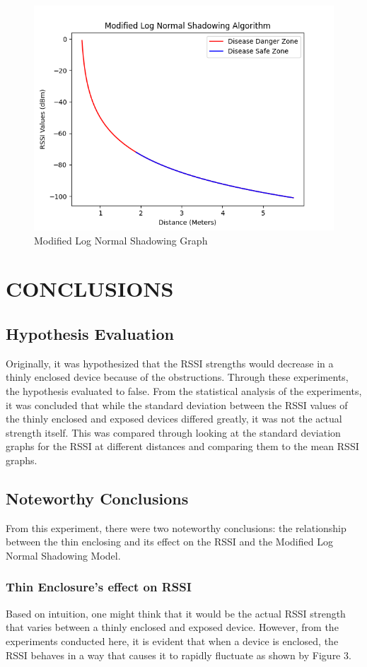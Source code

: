 \documentclass[letterpaper, 10 pt, conference]{ieeeconf}  %
\begin{document}
   \begin{figure}[thpb]
      \centering
      \includegraphics[scale=0.5]{ModelGraph.png}
      \caption{Modified Log Normal Shadowing Graph}
      \label{figurelabel}
   \end{figure}
\smallbreak

\section{CONCLUSIONS}
\subsection{Hypothesis Evaluation}
Originally, it was hypothesized that the RSSI strengths would decrease in a thinly enclosed device because of the obstructions. Through these experiments, the hypothesis evaluated to false. From the statistical analysis of the experiments, it was concluded that while the standard deviation between the RSSI values of the thinly enclosed and exposed devices differed greatly, it was not the actual strength itself. This was compared through looking at the standard deviation graphs for the RSSI at different distances and comparing them to the mean RSSI graphs. 
\subsection{Noteworthy Conclusions}
From this experiment, there were two noteworthy conclusions: the relationship between the thin enclosing and its effect on the RSSI and the Modified Log Normal Shadowing Model.
\smallbreak
\subsubsection{Thin Enclosure's effect on RSSI}
Based on intuition, one might think that it would be the actual RSSI strength that varies between a thinly enclosed and exposed device. However, from the experiments conducted here, it is evident that when a device is enclosed, the RSSI behaves in a way that causes it to rapidly fluctuate as shown by Figure 3.
\smallbreak
\end{document}
